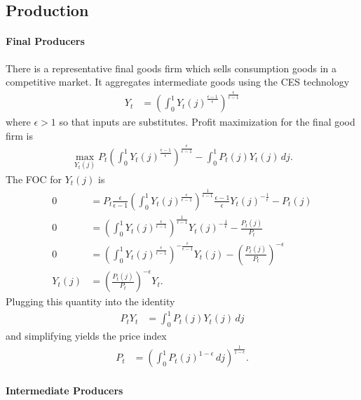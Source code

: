\documentclass[12 pt, oneside]{article}
\theoremstyle{definition}
\theoremstyle{definition}
\theoremstyle{definition}
\begin{document}
\subsection{Production}

\paragraph{Final Producers}

There is a representative final goods firm which sells consumption goods in a competitive market.
It aggregates intermediate goods using the CES technology
\begin{align*}
  Y_t & = \left(\int_0^1 Y_t(j)^{ \frac{\epsilon - 1}{\epsilon}}\right)^{\frac{\epsilon}{\epsilon - 1}}
\end{align*}
where $\epsilon > 1$ so that inputs are substitutes. Profit maximization for the final good firm is
\begin{align*}
  \max_{Y_t(j)} P_t\left(\int_0^1 Y_t(j)^{ \frac{\epsilon - 1}{\epsilon}}\right)^{\frac{\epsilon}{\epsilon - 1}} - \int_0^1 P_t(j) Y_t(j)\, dj.
\end{align*}
The FOC for $Y_t(j)$ is
\begin{align*}
  0 & = P_t\frac{\epsilon}{\epsilon - 1}\left(\int_0^1 Y_t(j)^{\frac{\epsilon}{\epsilon - 1}}\right)^{\frac{1}{\epsilon - 1}}\frac{\epsilon - 1}{\epsilon} Y_t(j)^{-\frac{1}{\epsilon}} - P_t(j)\\
  0 & = \left(\int_0^1 Y_t(j)^{\frac{\epsilon}{\epsilon - 1}}\right)^{\frac{1}{\epsilon - 1}}Y_t(j)^{-\frac{1}{\epsilon}} - \frac{P_t(j)}{P_t}\\
  0 & = \left(\int_0^1 Y_t(j)^{\frac{\epsilon}{\epsilon - 1}}\right)^{-\frac{\epsilon}{\epsilon - 1}}Y_t(j) - \left(\frac{P_t(j)}{P_t}\right)^{-\epsilon}\\
  Y_t(j) & =  \left(\frac{P_t(j)}{P_t}\right)^{-\epsilon} Y_t.
\end{align*}
Plugging this quantity into the identity
\begin{align*}
  P_tY_t & = \int_0^1 P_t(j) Y_t(j)\, dj
\end{align*}
and simplifying yields the price index
\begin{align*}
  P_t & = \left(\int_0^1 P_t(j)^{1 - \epsilon}\, dj\right)^{\frac{1}{1 - \epsilon}}.
\end{align*}

\paragraph{Intermediate Producers}
\end{document}
